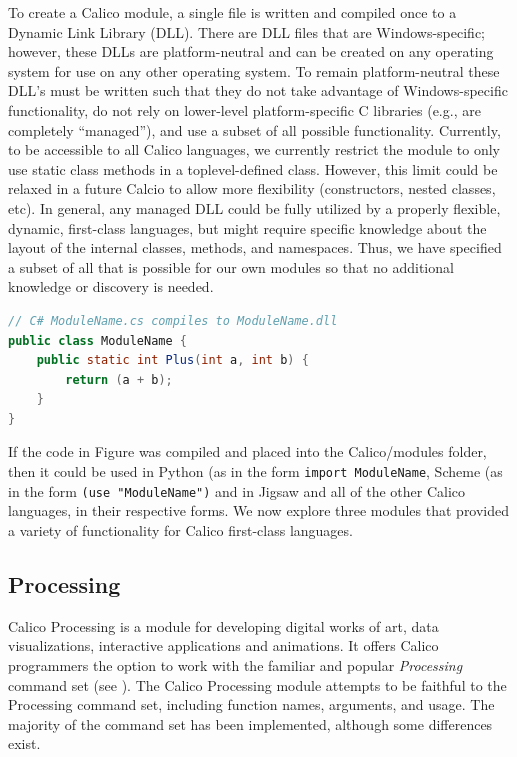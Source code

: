 \documentclass[preprint]{sigplanconf}
\begin{document}
To create a Calico module, a single file is written and compiled once
to a Dynamic Link Library (DLL). There are DLL files that are
Windows-specific; however, these DLLs are platform-neutral and can be
created on any operating system for use on any other operating
system. To remain platform-neutral these DLL's must be written such
that they do not take advantage of Windows-specific functionality, do
not rely on lower-level platform-specific C libraries (e.g., are
completely ``managed''), and use a subset of all possible
functionality. Currently, to be accessible to all Calico languages, we
currently restrict the module to only use static class methods in a
toplevel-defined class. However, this limit could be relaxed in a
future Calcio to allow more flexibility (constructors, nested classes,
etc). In general, any managed DLL could be fully utilized by a
properly flexible, dynamic, first-class languages, but might require
specific knowledge about the layout of the internal classes, methods,
and namespaces. Thus, we have specified a subset of all that is
possible for our own modules so that no additional knowledge or
discovery is needed.

\begin{lstlisting}[language=Java, caption={Example module template.}, label={csharp-module}]
// C# ModuleName.cs compiles to ModuleName.dll
public class ModuleName {
    public static int Plus(int a, int b) {
        return (a + b);
    }
}
\end{lstlisting}

If the code in Figure was compiled and placed into the Calico/modules
folder, then it could be used in Python (as in the form \texttt{import
ModuleName}, Scheme (as in the form \texttt{(use "ModuleName")} and in
Jigsaw and all of the other Calico languages, in their respective
forms. We now explore three modules that provided a variety of
functionality for Calico first-class languages.

\subsection{Processing}

Calico Processing is a module for developing digital works of art,
data visualizations, interactive applications and animations. It
offers Calico programmers the option to work with the familiar and
popular \textit{Processing} command set (see \cite{processing}). The Calico
Processing module attempts to be faithful to the Processing command
set, including function names, arguments, and usage. The majority of
the command set has been implemented, although some differences exist.
\end{document}
